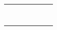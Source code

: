 \documentclass[a4paper,10pt]{article}
\begin{document}
\begin{center}
\begin{tabular}{|p{6cm}|c|c|c|c|c|}
& & & & & \\
\hline


& & & & & \\
\hline


& & & & & \\
\hline


& & & & & \\
\hline


& & & & & \\
\hline


& & & & & \\
\hline


& & & & & \\
\hline


& & & & & \\
\hline



\end{tabular}
\end{center}
\end{document}

